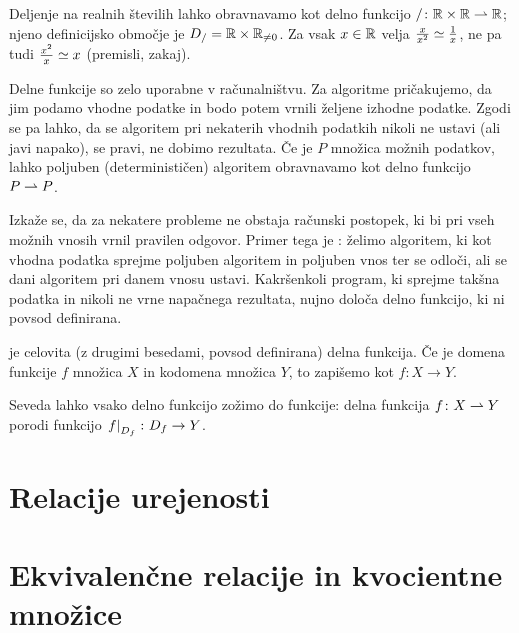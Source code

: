 		\begin{zgled}
			Deljenje na realnih številih lahko obravnavamo kot delno funkcijo $/\colon \mathbb{R} \times \mathbb{R} \mathrel{\rightharpoonup} \mathbb{R}$; njeno definicijsko območje je $D_{/} = \mathbb{R} \times \mathbb{R}_{\neq 0}$. Za vsak $x \in \mathbb{R}$ velja $\frac{x}{x^2} \simeq \frac{1}{x}$, ne pa tudi $\frac{x^2}{x} \simeq x$ (premisli, zakaj).
		\end{zgled}
		
		\begin{zgled}
			Delne funkcije so zelo uporabne v računalništvu. Za algoritme pričakujemo, da jim podamo vhodne podatke in bodo potem vrnili željene izhodne podatke. Zgodi se pa lahko, da se algoritem pri nekaterih vhodnih podatkih nikoli ne ustavi (ali javi napako), se pravi, ne dobimo rezultata. Če je $P$ množica možnih podatkov, lahko poljuben (determinističen) algoritem obravnavamo kot delno funkcijo $P \mathrel{\rightharpoonup} P$.
			
			Izkaže se, da za nekatere probleme ne obstaja računski postopek, ki bi pri vseh možnih vnosih vrnil pravilen odgovor. Primer tega je : želimo algoritem, ki kot vhodna podatka sprejme poljuben algoritem in poljuben vnos ter se odloči, ali se dani algoritem pri danem vnosu ustavi. Kakršenkoli program, ki sprejme takšna podatka in nikoli ne vrne napačnega rezultata, nujno določa delno funkcijo, ki ni povsod definirana. 
		\end{zgled}
		
		\begin{definicija}
			 je celovita (z drugimi besedami, povsod definirana) delna funkcija. Če je domena funkcije $f$ množica $X$ in kodomena množica $Y$, to zapišemo kot $f\colon X \to Y$.
		\end{definicija}
		
		Seveda lahko vsako delno funkcijo zožimo do funkcije: delna funkcija $f\colon X \mathrel{\rightharpoonup} Y$ porodi funkcijo $\left.{f}\right|_{D_{f}}\colon D_{f} \to Y$.
	
	
	\section{Relacije urejenosti}
	\section{Ekvivalenčne relacije in kvocientne množice}
